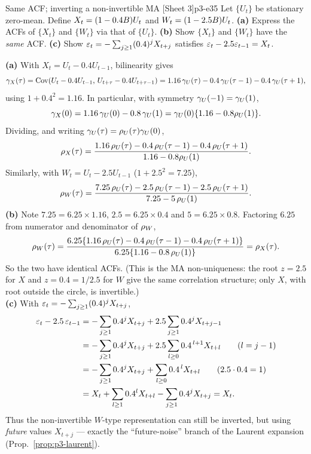 \begin{exercise}{Same ACF; inverting a non-invertible MA \quad\textnormal{[Sheet 3]}}{p3-e35}
Let $\{U_t\}$ be stationary zero-mean. Define $X_t=(1-0.4B)U_t$ and
$W_t=(1-2.5B)U_t$.
\textbf{(a)} Express the ACFs of $\{X_t\}$ and $\{W_t\}$ via that of $\{U_t\}$.
\textbf{(b)} Show $\{X_t\}$ and $\{W_t\}$ have the \emph{same} ACF.
\textbf{(c)} Show $\varepsilon_t=-\sum_{j\ge1}(0.4)^j X_{t+j}$ satisfies
$\varepsilon_t-2.5\varepsilon_{t-1}=X_t$.
\end{exercise}
\begin{solution}
\textbf{(a)} With $X_t=U_t-0.4U_{t-1}$, bilinearity gives
\[
\gamma_X(\tau)=\operatorname{Cov}(U_t-0.4U_{t-1},\,U_{t+\tau}-0.4U_{t+\tau-1})
=1.16\,\gamma_U(\tau)-0.4\,\gamma_U(\tau-1)-0.4\,\gamma_U(\tau+1),
\]
using $1+0.4^2=1.16$. In particular, with symmetry $\gamma_U(-1)=\gamma_U(1)$,
\[
\gamma_X(0)=1.16\,\gamma_U(0)-0.8\,\gamma_U(1)=\gamma_U(0)\{1.16-0.8\rho_U(1)\}.
\]
Dividing, and writing $\gamma_U(\tau)=\rho_U(\tau)\gamma_U(0)$,
\[
\rho_X(\tau)=\frac{1.16\,\rho_U(\tau)-0.4\,\rho_U(\tau-1)-0.4\,\rho_U(\tau+1)}{1.16-0.8\rho_U(1)} .
\]
Similarly, with $W_t=U_t-2.5U_{t-1}$ ($1+2.5^2=7.25$),
\[
\rho_W(\tau)=\frac{7.25\,\rho_U(\tau)-2.5\,\rho_U(\tau-1)-2.5\,\rho_U(\tau+1)}{7.25-5\,\rho_U(1)} .
\]
\textbf{(b)} Note $7.25=6.25\times1.16$, $2.5=6.25\times0.4$ and
$5=6.25\times0.8$. Factoring $6.25$ from numerator and denominator of
$\rho_W$,
\[
\rho_W(\tau)=\frac{6.25\{1.16\,\rho_U(\tau)-0.4\,\rho_U(\tau-1)-0.4\,\rho_U(\tau+1)\}}{6.25\{1.16-0.8\,\rho_U(1)\}}
=\rho_X(\tau).
\]
So the two have identical ACFs. (This is the MA non-uniqueness: the root
$z=2.5$ for $X$ and $z=0.4=1/2.5$ for $W$ give the same correlation structure;
only $X$, with root outside the circle, is invertible.)\\
\textbf{(c)} With $\varepsilon_t=-\sum_{j\ge1}(0.4)^j X_{t+j}$,
\[
\begin{aligned}
\varepsilon_t-2.5\,\varepsilon_{t-1}
&=-\sum_{j\ge1}0.4^{j}X_{t+j}+2.5\sum_{j\ge1}0.4^{j}X_{t+j-1}\\
&=-\sum_{j\ge1}0.4^{j}X_{t+j}+2.5\sum_{l\ge0}0.4^{\,l+1}X_{t+l}
\qquad(l=j-1)\\
&=-\sum_{j\ge1}0.4^{j}X_{t+j}+\sum_{l\ge0}0.4^{\,l}X_{t+l}
\qquad(2.5\cdot0.4=1)\\
&=X_t+\sum_{l\ge1}0.4^{l}X_{t+l}-\sum_{j\ge1}0.4^{j}X_{t+j}=X_t .
\end{aligned}
\]
Thus the non-invertible $W$-type representation can still be inverted, but using
\emph{future} values $X_{t+j}$ --- exactly the ``future-noise'' branch of the
Laurent expansion (Prop.~\ref{prop:p3-laurent}).
\end{solution}

